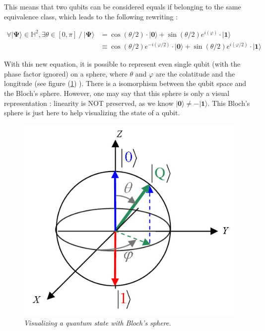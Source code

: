 \documentclass[a4paper,12pt]{report}
\newcommand{\quSt}[1]{\bm{|#1\rangle}}
\newcommand{\para}[1]{\par{#1}\\}
\begin{document}
\vspace{1\baselineskip}

\par{
	This means that two qubits can be considered equals if belonging to the same equivalence class, which leads to the following rewriting :
}

\begin{align}
	\label{blochEq}
	\forall \quSt{\Psi} \in \mathbb{H}^2 , \exists \theta \in [0, \pi] ~/~ \quSt{\Psi} &= \cos(\theta/2) \cdot \quSt{0} + \sin(\theta/2) e^{i(\varphi)} \cdot \quSt{1} \\
	&\equiv \cos(\theta/2) e^{-i(\varphi/2)} \cdot \quSt{0} + \sin(\theta/2) e^{i(\varphi/2)} \cdot \quSt{1}
\end{align}

\vspace{1\baselineskip}

\para{
    With this new equation, it is possible to represent even single qubit (with the phase factor ignored) on a sphere, where $\theta$ and $\varphi$ are the colatitude and the longitude (see figure (\ref{bloch}) ). There is a isomorphism between the qubit space and the Bloch's sphere. However, one may say that this sphere is only a visual representation : linearity is NOT preserved, as we know $\quSt{0} \neq -\quSt{1}$. This Bloch's sphere is just here to help visualizing the state of a qubit.
}

\begin{figure}
	\begin{center}
		\includegraphics[scale=0.60]{images/bloch}
	\end{center}
	\caption{\textit{Visualizing a quantum state with Bloch's sphere.}}
	\label{bloch}
\end{figure}
\end{document}
